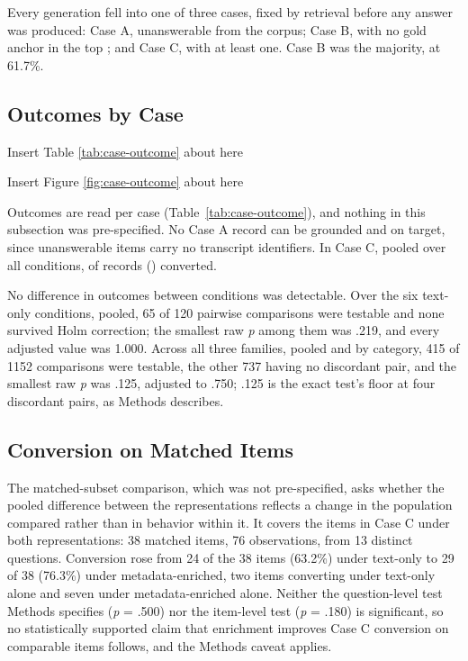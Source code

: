 Every generation fell into one of three cases, fixed by retrieval before any
answer was produced: Case A, unanswerable from the corpus; Case B, with no gold
anchor in the top \thesisTopK{}; and Case C, with at least one. Case B was the
majority, at 61.7\%.

\subsection{Outcomes by Case}

{\centering\noindent Insert Table \ref{tab:case-outcome} about here\par}

{\centering\noindent Insert Figure \ref{fig:case-outcome} about here\par}

Outcomes are read per case (Table~\ref{tab:case-outcome}), and nothing in this
subsection was pre-specified. No Case A record can be grounded and on target,
since unanswerable items carry no transcript identifiers. In Case C, pooled over all \thesisNumConditions{}
conditions, \thesisQeightCaseCAnsweredGroundedCorrect{} of \thesisQeightCaseC{}
records (\thesisQeightCaseCConversionPct{}) converted.

No difference in outcomes between conditions was detectable. Over the six
text-only conditions, pooled, 65 of 120 pairwise comparisons were testable and none
survived Holm correction; the smallest raw \emph{p} among them was .219, and
every adjusted value was 1.000. Across all three families, pooled and by
category, 415 of 1152 comparisons
were testable, the other 737 having no discordant pair, and the smallest raw
\emph{p} was .125, adjusted to .750; .125 is the exact test's floor at four
discordant pairs, as Methods describes.

\subsection{Conversion on Matched Items}

The matched-subset comparison, which was not pre-specified, asks whether the
pooled difference between the representations reflects a change in the
population compared rather than in behavior within it. It covers the items in
Case C under both representations: 38 matched items, 76 observations,
from 13 distinct questions. Conversion rose from 24 of the 38 items (63.2\%) under
text-only to 29 of 38 (76.3\%) under metadata-enriched,
two items converting under text-only alone and seven under metadata-enriched
alone. Neither the question-level test Methods specifies (\emph{p} = .500)
nor the item-level test (\emph{p} = .180) is significant, so no
statistically supported claim that enrichment improves Case C conversion on
comparable items follows, and the Methods caveat applies.

